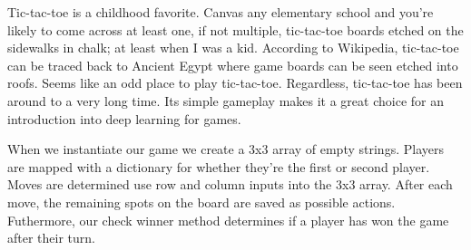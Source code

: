 

Tic-tac-toe is a childhood favorite.
Canvas any elementary school and you're likely to come across at least one, if not
multiple, tic-tac-toe boards etched on the sidewalks in chalk;
at least when I was a kid.
According to Wikipedia, tic-tac-toe can be traced back to Ancient Egypt where game boards can be seen etched into roofs.
Seems like an odd place to play tic-tac-toe.
Regardless, tic-tac-toe has been around to a very long time.
Its simple gameplay makes it a great choice for an introduction into deep learning for games.

When we instantiate our game we create a 3x3 array of empty strings.
Players are mapped with a dictionary for whether they're the first or second player.
Moves are determined use row and column inputs into the 3x3 array.
After each move, the remaining spots on the board are saved as possible actions.
Futhermore, our check winner method determines if a player has won the game after their turn.
